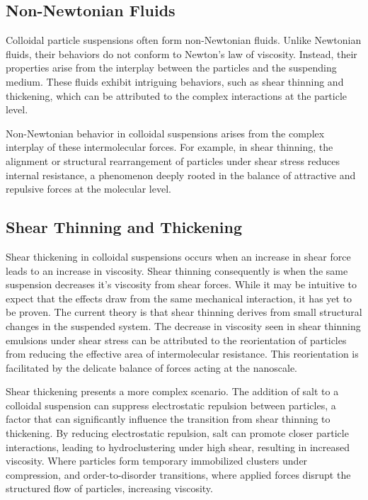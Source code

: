 \subsection{Non-Newtonian Fluids}
Colloidal particle suspensions often form non-Newtonian fluids. Unlike Newtonian fluids, their behaviors do not conform to Newton's law of viscosity. Instead, their properties arise from the interplay between the particles and the suspending medium. These fluids exhibit intriguing behaviors, such as shear thinning and thickening, which can be attributed to the complex interactions at the particle level.\cite{Rheo2}

Non-Newtonian behavior in colloidal suspensions arises from the complex interplay of these intermolecular forces. For example, in shear thinning, the alignment or structural rearrangement of particles under shear stress reduces internal resistance, a phenomenon deeply rooted in the balance of attractive and repulsive forces at the molecular level.\cite{Rheo2}

\subsection{Shear Thinning and Thickening}
Shear thickening in colloidal suspensions occurs when an increase in shear force leads to an increase in viscosity. Shear thinning consequently is when the same suspension decreases it's viscosity from shear forces. While it may be intuitive to expect that the effects draw from the same mechanical interaction, it has yet to be proven. The current theory is that shear thinning derives from small structural changes in the suspended system. The decrease in viscosity seen in shear thinning emulsions under shear stress can be attributed to the reorientation of particles from reducing the effective area of intermolecular resistance. This reorientation is facilitated by the delicate balance of forces acting at the nanoscale. 

Shear thickening presents a more complex scenario. The addition of salt to a colloidal suspension can suppress electrostatic repulsion between particles, a factor that can significantly influence the transition from shear thinning to thickening. By reducing electrostatic repulsion, salt can promote closer particle interactions, leading to hydroclustering under high shear, resulting in increased viscosity. Where particles form temporary immobilized clusters under compression, and order-to-disorder transitions, where applied forces disrupt the structured flow of particles, increasing viscosity. \cite{hydroshock, ShockCrash}

